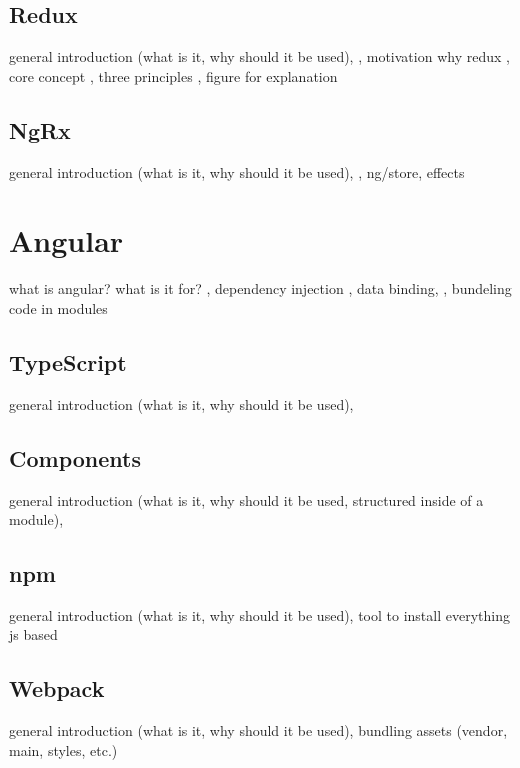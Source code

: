 \documentclass[Bachelor,BIF,english]{twbook}
\begin{document}
\subsection{Redux}
general introduction (what is it, why should it be used), \cite{Redux}, motivation why redux \cite{ReduxIntroMoti}, core concept \cite{ReduxIntroCC}, three principles \cite{ReduxIntro3P}, figure for explanation

\subsection{NgRx}
general introduction (what is it, why should it be used), \cite{Ngrx}, ng/store, effects


\section{Angular}
what is angular? what is it for? \cite[p.~xxiv-xxix]{RxAngular5Prj}, dependency injection \cite[p.~]{YakovFainAngular} \cite[p.~211]{RxAngular5Prj}, data binding, \cite[p.~]{YakovFainAngular}, bundeling code in modules \cite[p.~116]{RxAngular5Prj}

\subsection{TypeScript}
general introduction \cite[p.~19]{RxAngular5Prj} \cite{TypeScript} \cite[p.~41]{RxAngular5Prj} (what is it, why should it be used), 

\subsection{Components}
general introduction \cite[p.~22]{RxAngular5Prj} \cite[p.~89]{RxAngular5Prj} \cite[p.~159]{RxAngular5Prj} (what is it, why should it be used, structured inside of a module), 

\subsection{npm}
general introduction \cite[p.~71]{RxAngular5Prj} (what is it, why should it be used), 
tool to install everything js based

\subsection{Webpack}
general introduction \cite[p.~113]{RxAngular5Prj} (what is it, why should it be used), 
bundling assets (vendor, main, styles, etc.)
\end{document}

